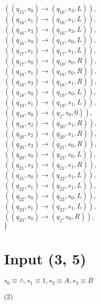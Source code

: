 \documentclass{article} %
\begin{document}
\begin{center}
\begin{varwidth}{\textwidth}
\begin{tasks}[label={},label-width={1cm}]
                \task
                $((q_{15}, s_{0}) \to ( q_{16}, s_{3}, L)),$\\
                $((q_{16}, s_{1}) \to ( q_{16}, s_{1}, L)),$\\
                $((q_{16}, s_{3}) \to ( q_{16}, s_{3}, L)),$\\
                $((q_{16}, s_{0}) \to ( q_{17}, s_{0}, L)),$\\
                $((q_{17}, s_{1}) \to ( q_{17}, s_{1}, L)),$\\
                $((q_{17}, s_{0}) \to ( q_{10}, s_{0}, R)),$\\
                $((q_{18}, s_{1}) \to ( q_{18}, s_{0}, R)),$\\
                $((q_{18}, s_{3}) \to ( q_{18}, s_{1}, R)),$\\
                $((q_{18}, s_{0}) \to ( q_{19}, s_{0}, L)),$\\
                $((q_{19}, s_{1}) \to ( q_{19}, s_{1}, L)),$\\
                $((q_{19}, s_{0}) \to ( q_{f}, s_{0}, 0)),$\\
                $((q_{18}, s_{2}) \to ( q_{20}, s_{1}, R)),$\\
                $((q_{20}, s_{2}) \to ( q_{20}, s_{1}, R)),$\\
                $((q_{20}, s_{3}) \to ( q_{21}, s_{0}, R)),$\\
                $((q_{20}, s_{0}) \to ( q_{23}, s_{0}, L)),$\\
                $((q_{21}, s_{3}) \to ( q_{21}, s_{1}, R)),$\\
                $((q_{21}, s_{0}) \to ( q_{22}, s_{1}, L)),$\\
                $((q_{22}, s_{1}) \to ( q_{22}, s_{1}, L)),$\\
                $((q_{22}, s_{0}) \to ( q_{23}, s_{0}, L)),$\\
                $((q_{23}, s_{1}) \to ( q_{23}, s_{1}, L)),$\\
                $((q_{23}, s_{0}) \to ( q_{f}, s_{0}, R)),$\\
                $\}$
            \end{tasks}
            \end{varwidth}
        \end{center}
    \section{Input (3, 5)}
    $s_0 \equiv \land, s_1 \equiv 1, s_2 \equiv A, s_3 \equiv B$\\
        \begin{center}
            \begin{varwidth}{\textwidth}
            \begin{tasks}[label={(\roman*)},label-width={1cm}] (2)
                \task

                \task

            \end{tasks}
            \end{varwidth}
        \end{center}
\end{document}

